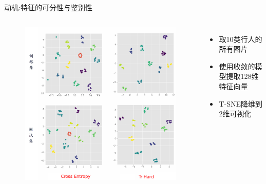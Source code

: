 \documentclass[usenames,dvipsnames,notes]{beamer}
\begin{document}
\begin{frame}{动机:特征的可分性与鉴别性}
	\begin{columns}
		\begin{figure}
			\centering
			\includegraphics[width=\textwidth]{fig/final0.png}
		\end{figure}
		\begin{itemize}
			\item 取10类行人的所有图片
			\item 使用收敛的模型提取128维特征向量
			\item T-SNE降维到2维可视化
		\end{itemize}
	\end{columns}
\end{frame}
\end{document}
